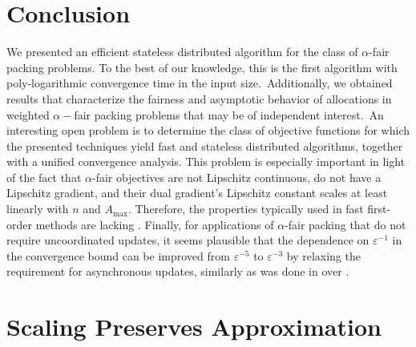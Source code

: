 \documentclass[11pt]{article}
\newif\iffullpaper
\begin{document}
\section{Conclusion}\label{section:conclusion}

We presented an efficient stateless distributed algorithm for the class of $\alpha$-fair packing problems. To the best of our knowledge, this is the first algorithm with poly-logarithmic convergence time in the input size.~{Additionally, we obtained results that characterize the fairness and asymptotic behavior of allocations in weighted $\alpha-$fair packing problems that may be of independent interest.}~{An interesting} open problem is to determine the class of objective functions for which the presented techniques yield fast and stateless distributed algorithms, together with a unified convergence analysis. This problem is especially important in light of the fact that $\alpha$-fair objectives are not Lipschitz continuous, do not have a Lipschitz gradient, and their dual gradient's Lipschitz constant scales at least linearly with $n$ and $A_{\max}$. Therefore, the properties typically used in fast first-order methods are lacking \cite{nesterov2004introductory,  zhuOrecchia2014novel}. {Finally, for applications of $\alpha$-fair packing that do not require uncoordinated updates, it seems plausible that the dependence on $\varepsilon^{-1}$ in the convergence bound can be improved from $\varepsilon^{-5}$ to $\varepsilon^{-3}$ by relaxing the requirement for asynchronous updates, similarly as was done in \cite{d-allen2014using} over \cite{AwerbuchKhandekar2009}.}
 
\iffullpaper
\section*{Acknowledgements}

We thank Nikhil Devanur for pointing out the equivalence of the $\alpha$-fair packing for $\alpha = 1$ and the problem of finding an equilibrium allocation in Eisenberg-Gale markets with Leontief utilities.
\fi
 
\newpage


{\small

}
\newpage
\iffullpaper
\appendix

\section{Scaling Preserves Approximation}\label{appendix:scaling}
\end{document}
